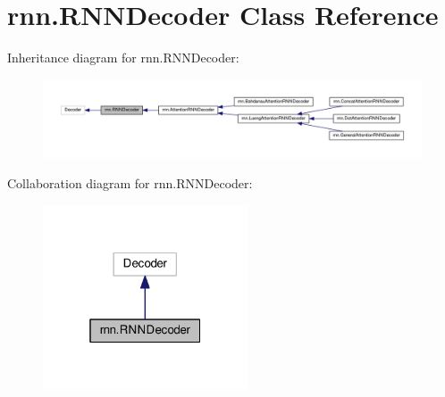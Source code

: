 \hypertarget{classrnn_1_1RNNDecoder}{}\section{rnn.\+R\+N\+N\+Decoder Class Reference}
\label{classrnn_1_1RNNDecoder}


Inheritance diagram for rnn.\+R\+N\+N\+Decoder\+:
\nopagebreak
\begin{figure}[H]
\begin{center}
\leavevmode
\includegraphics[width=350pt]{classrnn_1_1RNNDecoder__inherit__graph}
\end{center}
\end{figure}


Collaboration diagram for rnn.\+R\+N\+N\+Decoder\+:
\nopagebreak
\begin{figure}[H]
\begin{center}
\leavevmode
\includegraphics[width=172pt]{classrnn_1_1RNNDecoder__coll__graph}
\end{center}
\end{figure}
